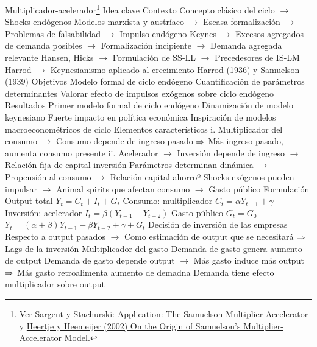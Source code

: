 \documentclass{nuevotema}
\begin{document}
\begin{esquemal}
		\2 Multiplicador-acelerador\footnote{Ver \href{https://python.quantecon.org/samuelson.html}{Sargent y Stachurski: Application: The Samuelson Multiplier-Accelerator} y \href{https://muse.jhu.edu/article/13350/pdf}{Heertje y Heemeijer (2002) On the Origin of Samuelson's Multiplier-Accelerator Model}.}
			\3 Idea clave
				\4 Contexto
				\4[] Concepto clásico del ciclo
				\4[] $\to$ Shocks endógenos
				\4[] Modelos marxista y austríaco
				\4[] $\to$ Escasa formalización
				\4[] $\to$ Problemas de falsabilidad
				\4[] $\to$ Impulso endógeno
				\4[] Keynes
				\4[] $\to$ Excesos agregados de demanda posibles
				\4[] $\to$ Formalización incipiente
				\4[] $\to$ Demanda agregada relevante
				\4[] Hansen, Hicks
				\4[] $\to$ Formulación de SS-LL
				\4[] $\to$ Precedesores de IS-LM
				\4[] Harrod
				\4[] $\to$ Keynesianismo aplicado al crecimiento
				\4[] Harrod (1936) y Samuelson (1939)
				\4 Objetivos
				\4[] Modelo formal de ciclo endógeno
				\4[] Cuantificación de parámetros determinantes
				\4[] Valorar efecto de impulsos exógenos sobre ciclo endógeno
				\4 Resultados
				\4[] Primer modelo formal de ciclo endógeno
				\4[] Dinamización de modelo keynesiano
				\4[] Fuerte impacto en política económica
				\4[] Inspiración de modelos macroeconométricos de ciclo
				\4[] Elementos característicos
				\4[] i. Multiplicador del consumo
				\4[] $\to$ Consumo depende de ingreso pasado
				\4[] $\then$ Más ingreso pasado, aumenta consumo presente
				\4[] ii. Acelerador
				\4[] $\to$ Inversión depende de ingreso
				\4[] $\to$ Relación fija de capital inversión
				\4[] Parámetros determinan dinámica
				\4[] $\to$ Propensión al consumo
				\4[] $\to$ Relación capital ahorroº
				\4[] Shocks exógenos pueden impulsar
				\4[] $\to$ Animal spirits que afectan consumo
				\4[] $\to$ Gasto público
			\3 Formulación
				\4 Output total
				\4[] $Y_t = C_t + I_t + G_t$
				\4 Consumo: multiplicador
				\4[] $C_t = \alpha Y_{t-1} + \gamma$
				\4 Inversión: acelerador
				\4[] $I_t = \beta \left( Y_{t-1} - Y_{t-2} \right)$
				\4 Gasto público
				\4[] $G_t = G_0$
				\4[$\then$] $Y_t = (\alpha +\beta) Y_{t-1} - \beta Y_{t-2} + \gamma + G_t$
				\4 Decisión de inversión de las empresas
				\4[] Respecto a output pasados
				\4[] $\to$ Como estimación de output que se necesitará
				\4[] $\then$ Lags de la inversión
				\4 Multiplicador del gasto
				\4[] Demanda de gasto genera aumento de output
				\4[] Demanda de gasto depende output
				\4[] $\to$ Más gasto induce más output
				\4[] $\then$ Más gasto retroalimenta aumento de demadna
				\4[] Demanda tiene efecto multiplicador sobre output

\end{esquemal}
\end{document}
